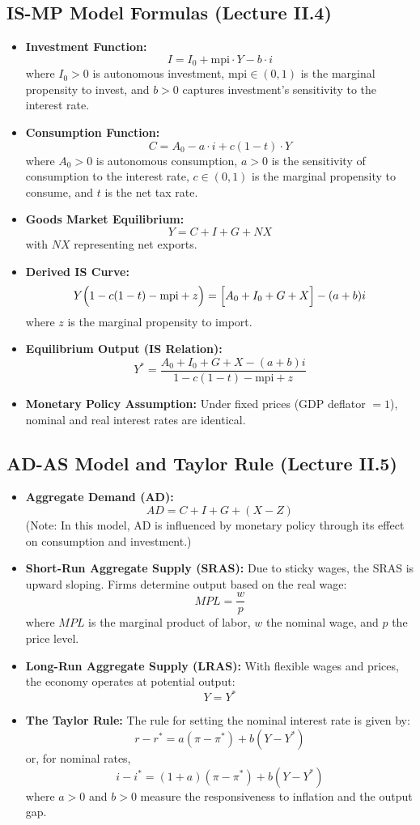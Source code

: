 \subsection*{IS-MP Model Formulas (Lecture II.4)}
\begin{itemize}
    \item \textbf{Investment Function:}
    \[
    I = I_0 + \text{mpi} \cdot Y - b \cdot i
    \]
    where \(I_0 > 0\) is autonomous investment, \(\text{mpi} \in (0,1)\) is the marginal propensity to invest, and \(b > 0\) captures investment’s sensitivity to the interest rate.
    \item \textbf{Consumption Function:}
    \[
    C = A_0 - a \cdot i + c(1-t) \cdot Y
    \]
    where \(A_0 > 0\) is autonomous consumption, \(a > 0\) is the sensitivity of consumption to the interest rate, \(c \in (0,1)\) is the marginal propensity to consume, and \(t\) is the net tax rate.
    \item \textbf{Goods Market Equilibrium:}
    \[
    Y = C + I + G + NX
    \]
    with \(NX\) representing net exports.
    \item \textbf{Derived IS Curve:}
    \[
    Y\Bigl(1 - c(1-t) - \text{mpi} + z\Bigr) = \Bigl[A_0 + I_0 + G + X\Bigr] - (a+b)i
    \]
    where \(z\) is the marginal propensity to import.
    \item \textbf{Equilibrium Output (IS Relation):}
    \[
    Y^* = \frac{A_0 + I_0 + G + X - (a+b)i}{1 - c(1-t) - \text{mpi} + z}
    \]
    \item \textbf{Monetary Policy Assumption:} Under fixed prices (GDP deflator \(=1\)), nominal and real interest rates are identical.
\end{itemize}

\subsection*{AD-AS Model and Taylor Rule (Lecture II.5)}
\begin{itemize}
    \item \textbf{Aggregate Demand (AD):}
    \[
    AD = C + I + G + (X - Z)
    \]
    (Note: In this model, AD is influenced by monetary policy through its effect on consumption and investment.)
    \item \textbf{Short-Run Aggregate Supply (SRAS):}
    Due to sticky wages, the SRAS is upward sloping. Firms determine output based on the real wage:
    \[
    MPL = \frac{w}{p}
    \]
    where \(MPL\) is the marginal product of labor, \(w\) the nominal wage, and \(p\) the price level.
    \item \textbf{Long-Run Aggregate Supply (LRAS):}
    With flexible wages and prices, the economy operates at potential output:
    \[
    Y = Y^*
    \]
    \item \textbf{The Taylor Rule:}
    The rule for setting the nominal interest rate is given by:
    \[
    r - r^* = a(\pi - \pi^*) + b(Y - Y^*)
    \]
    or, for nominal rates,
    \[
    i - i^* = (1+a)(\pi - \pi^*) + b(Y - Y^*)
    \]
    where \(a>0\) and \(b>0\) measure the responsiveness to inflation and the output gap.
\end{itemize}